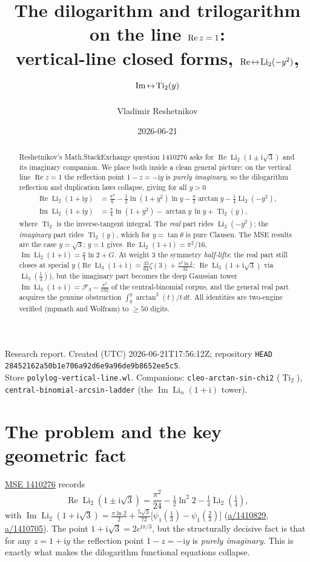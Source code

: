\documentclass[11pt]{article}
\title{The dilogarithm and trilogarithm on the line $\Real z=1$:\\
vertical-line closed forms, $\Real\!\leftrightarrow\!\Li_2(-y^2)$, $\Imag\!\leftrightarrow\!\Ti_2(y)$}
\author{Vladimir Reshetnikov}
\date{2026-06-21}
\DeclareMathOperator{\Li}{Li}
\DeclareMathOperator{\Ti}{Ti}
\newcommand{\iu}{\mathrm{i}}
\newcommand{\Real}{\operatorname{Re}}
\newcommand{\Imag}{\operatorname{Im}}
\theoremstyle{plain}\newtheorem{theorem}{Theorem}\newtheorem{proposition}[theorem]{Proposition}
\theoremstyle{remark}\newtheorem{remark}[theorem]{Remark}
\begin{document}
\maketitle
\begin{center}\small
Research report. Created (UTC) 2026-06-21T17:56:12Z; repository \texttt{HEAD}
\texttt{28452162a50b1e706a92d6e9a96de9b8652ee5c5}.\\
Store \texttt{polylog-vertical-line.wl}. Companions: \texttt{cleo-arctan-sin-chi2} ($\Ti_2$),
\texttt{central-binomial-arcsin-ladder} (the $\Imag\Li_n(1+\iu)$ tower).
\end{center}

\begin{abstract}
Reshetnikov's Math.StackExchange question 1410276 asks for $\Real\Li_2(1\pm\iu\sqrt3)$ and its imaginary
companion. We place both inside a clean general picture: on the vertical line $\Real z=1$ the reflection
point $1-z=-\iu y$ is \emph{purely imaginary}, so the dilogarithm reflection and duplication laws collapse,
giving for all $y>0$
\begin{align*}
  \Real\Li_2(1+\iu y)&=\frac{\pi^2}{6}-\tfrac12\ln(1{+}y^2)\ln y-\frac\pi2\arctan y-\tfrac14\Li_2(-y^2),\\
  \Imag\Li_2(1+\iu y)&=\frac\pi4\ln(1{+}y^2)-\arctan y\,\ln y+\Ti_2(y),
\end{align*}
where $\Ti_2$ is the inverse-tangent integral. The \emph{real} part rides $\Li_2(-y^2)$; the \emph{imaginary}
part rides $\Ti_2(y)$, which for $y=\tan\theta$ is pure Clausen. The MSE results are the case $y=\sqrt3$;
$y=1$ gives $\Real\Li_2(1+\iu)=\pi^2/16$, $\Imag\Li_2(1+\iu)=\tfrac\pi4\ln2+G$. At weight $3$ the symmetry
\emph{half-lifts}: the real part still closes at special $y$ ($\Real\Li_3(1+\iu)=\tfrac{35}{64}\zeta(3)+\tfrac{\pi^2\ln2}{32}$;
$\Real\Li_3(1+\iu\sqrt3)$ via $\Li_3(\tfrac14)$), but the imaginary part becomes the deep Gaussian tower
$\Imag\Li_3(1+\iu)=\mathcal F_3-\tfrac{\pi^3}{192}$ of the central-binomial corpus, and the general real part
acquires the genuine obstruction $\int_0^y\arctan^2(t)/t\,dt$. All identities are two-engine verified
(mpmath and Wolfram) to $\ge50$ digits.
\end{abstract}

\section{The problem and the key geometric fact}
\href{https://math.stackexchange.com/q/1410276}{MSE 1410276} records
\begin{equation}\label{eq:mse}
  \Real\Li_2(1\pm\iu\sqrt3)=\frac{\pi^2}{24}-\tfrac12\ln^2 2-\tfrac14\Li_2(\tfrac14),
\end{equation}
with $\Imag\Li_2(1+\iu\sqrt3)=\tfrac{\pi\ln2}{2}+\tfrac{5\sqrt3}{72}\bigl[\psi_1(\tfrac13)-\psi_1(\tfrac23)\bigr]$
(\href{https://math.stackexchange.com/a/1410829}{a/1410829}, \href{https://math.stackexchange.com/a/1410705}{a/1410705}).
The point $1+\iu\sqrt3=2e^{\iu\pi/3}$, but the structurally decisive fact is that for any $z=1+\iu y$ the
reflection point $1-z=-\iu y$ is \emph{purely imaginary}. This is exactly what makes the dilogarithm
functional equations collapse.
\end{document}
